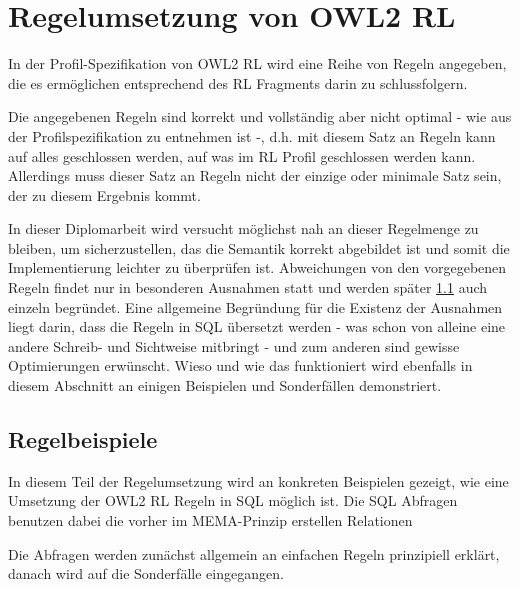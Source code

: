 \section{Regelumsetzung von OWL2 RL}
\label{abschnitt-regelumsetzung-owl2-rl}
In der Profil-Spezifikation von OWL2 RL \cite{OWL2Profiles} wird eine Reihe von Regeln angegeben, die es ermöglichen entsprechend des RL Fragments darin zu schlussfolgern.

Die angegebenen Regeln sind korrekt und vollständig aber nicht optimal - wie aus der Profilspezifikation zu entnehmen ist -, d.h. mit diesem Satz an Regeln kann auf alles geschlossen werden, auf was im RL Profil geschlossen werden kann. Allerdings muss dieser Satz an Regeln nicht der einzige oder minimale Satz sein, der zu diesem Ergebnis kommt.

In dieser Diplomarbeit wird versucht möglichst nah an dieser Regelmenge zu bleiben, um sicherzustellen, das die Semantik korrekt abgebildet ist und somit die Implementierung leichter zu überprüfen ist.
Abweichungen von den vorgegebenen Regeln findet nur in besonderen Ausnahmen statt und werden später \ref{abschnitt-regelbeispiele} auch einzeln begründet. Eine allgemeine Begründung für die Existenz der Ausnahmen liegt darin, dass die Regeln in SQL übersetzt werden - was schon von alleine eine andere Schreib- und Sichtweise  mitbringt - und zum anderen sind gewisse Optimierungen erwünscht.
Wieso und wie das funktioniert wird ebenfalls in diesem Abschnitt an einigen Beispielen und Sonderfällen demonstriert.

\subsection{Regelbeispiele}
\label{abschnitt-regelbeispiele}
In diesem Teil der Regelumsetzung wird an konkreten Beispielen gezeigt, wie eine Umsetzung der OWL2 RL Regeln in SQL möglich ist. Die SQL Abfragen benutzen dabei die vorher im MEMA-Prinzip erstellen Relationen

Die Abfragen werden zunächst allgemein an einfachen Regeln prinzipiell erklärt, danach wird auf die Sonderfälle eingegangen.

